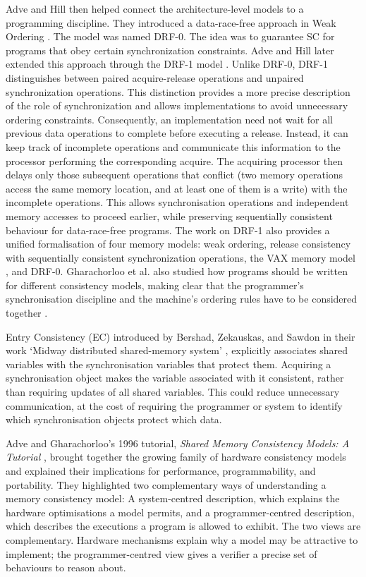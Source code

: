 Adve and Hill then helped connect the architecture-level models to a programming discipline. They introduced a data-race-free approach in Weak Ordering \cite{advehill1990wo}. The model was named DRF-0. The idea was to guarantee SC for programs that obey certain  synchronization constraints. 
Adve and Hill later extended this approach through the DRF-1 model \cite{advehill1993}. Unlike DRF-0, DRF-1 distinguishes between paired acquire-release operations and unpaired synchronization operations. This distinction provides a more precise description of the role of synchronization and allows implementations to avoid unnecessary ordering constraints. Consequently, an implementation need not wait for all previous data operations to complete before executing a release. Instead, it can keep track of incomplete operations and communicate this information to the processor performing the corresponding acquire. The acquiring processor then delays only those subsequent operations that conflict (two memory operations access the same memory location, and at least one of them is a write) with the incomplete operations. This allows synchronisation operations and independent memory accesses to proceed earlier, while preserving sequentially consistent behaviour for data-race-free programs. The work on DRF-1 also provides a unified formalisation of four memory models: weak ordering, release consistency with sequentially consistent synchronization operations, the VAX memory model \cite{vaxarchitecture1981}, and DRF-0. Gharachorloo et al. also studied how programs should be written for different consistency models, making clear that the programmer’s synchronisation discipline and the machine’s ordering rules have to be considered together \cite{GHARACHORLOO1992399}.

Entry Consistency (EC) introduced by Bershad, Zekauskas, and Sawdon  in their work `Midway distributed shared-memory system' \cite{bershad1993midway}, explicitly associates shared variables with the synchronisation variables that protect them. Acquiring a synchronisation object makes the variable associated with it consistent, rather than requiring updates of all shared variables. This could reduce unnecessary communication, at the cost of requiring the programmer or system to identify which synchronisation objects protect which data.

Adve and Gharachorloo's 1996 tutorial, \emph{Shared Memory Consistency Models: A Tutorial}  \cite{DBLP:journals/computer/AdveG96}, brought together the growing family of hardware consistency models and explained their implications for performance, programmability, and portability. They highlighted two complementary ways of understanding a memory consistency model: A system-centred description, which explains the hardware optimisations a model permits, and a programmer-centred description, which describes the executions a program is allowed to exhibit. The two views are complementary. Hardware mechanisms explain why a model may be attractive to implement; the programmer-centred view gives a verifier a precise set of behaviours to reason about.


